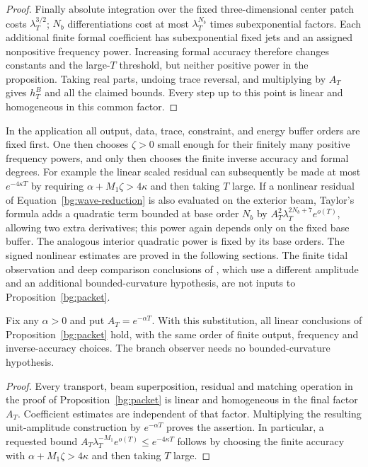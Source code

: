 \begin{proof}
Finally absolute integration over the fixed three-dimensional
center patch costs $\lambda_T^{3/2}$; $N_b$ differentiations cost
at most $\lambda_T^{N_b}$ times subexponential factors.  Each
additional finite formal coefficient has subexponential fixed
jets and an assigned nonpositive frequency power.  Increasing
formal accuracy therefore changes constants and the large-$T$
threshold, but neither positive power in the proposition.
Taking real parts, undoing trace reversal, and multiplying by
$A_T$ gives $h_T^B$ and all the claimed bounds.  Every step up to
this point is linear and homogeneous in this common factor.
\end{proof}

\begin{remark}\label{bg:choices}
In the application all output, data, trace, constraint, and energy
buffer orders are fixed first.  One then chooses $\zeta>0$ small
enough for their finitely many positive frequency powers, and only
then chooses the finite inverse accuracy and formal degrees.
For example the linear scaled residual can subsequently be made
at most $e^{-4\kappa T}$ by requiring
$\alpha+M_1\zeta>4\kappa$ and then taking $T$ large.
If a nonlinear residual of Equation~\eqref{bg:wave-reduction} is
also evaluated on the exterior beam, Taylor's formula adds a
quadratic term bounded at base order $N_b$ by
$A_T^2\lambda_T^{2N_b+7}e^{o(T)}$, allowing two extra derivatives;
this power again depends only on the fixed base buffer.  The
analogous interior quadratic power is fixed by its base orders.
The signed nonlinear estimates are proved in the following
sections.  The finite tidal observation and deep comparison
conclusions of \cite{Foundation}, which use a different amplitude
and an additional bounded-curvature hypothesis, are not inputs
to Proposition~\ref{bg:packet}.
\end{remark}


\begin{corollary}
\label{bg:amplitude-independent}
Fix any $\alpha>0$ and put $A_T=e^{-\alpha T}$. With this substitution,
all linear conclusions of Proposition~\ref{bg:packet} hold, with the
same order of finite output, frequency and inverse-accuracy choices.
The branch observer needs no bounded-curvature hypothesis.
\end{corollary}
\begin{proof}
Every transport, beam superposition, residual and matching operation
in the proof of Proposition~\ref{bg:packet} is linear and homogeneous
in the final factor $A_T$. Coefficient estimates are independent of
that factor. Multiplying the resulting unit-amplitude construction by
$e^{-\alpha T}$ proves the assertion. In particular, a requested
bound $A_T\lambda_T^{-M_1}e^{o(T)}\le e^{-4\kappa T}$ follows by
choosing the finite accuracy with $\alpha+M_1\zeta>4\kappa$ and then
taking $T$ large.
\end{proof}

